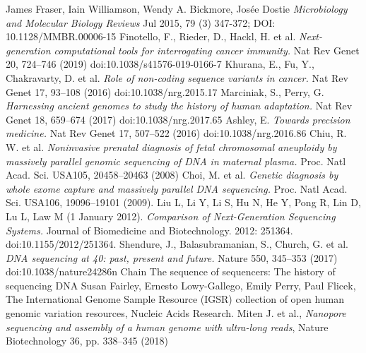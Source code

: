 \documentclass[a4paper,11pt,twoside]{report}
\theoremstyle{definition}
\begin{document}

\begin{thebibliography}{49}%
James Fraser, Iain Williamson, Wendy A. Bickmore, Josée Dostie
\emph{Microbiology and Molecular Biology Reviews} Jul 2015, 79 (3) 347-372; DOI: 10.1128/MMBR.00006-15 
Finotello, F., Rieder, D., Hackl, H. et al. \emph{Next-generation computational tools for interrogating cancer immunity.} Nat Rev Genet 20, 724–746 (2019) doi:10.1038/s41576-019-0166-7
Khurana, E., Fu, Y., Chakravarty, D. et al. \emph{Role of non-coding sequence variants in cancer.} Nat Rev Genet 17, 93–108 (2016) doi:10.1038/nrg.2015.17
 Marciniak, S., Perry, G. \emph{Harnessing ancient genomes to study the history of human adaptation.} Nat Rev Genet 18, 659–674 (2017) doi:10.1038/nrg.2017.65
 Ashley, E. \emph{Towards precision medicine.} Nat Rev Genet 17, 507–522 (2016) doi:10.1038/nrg.2016.86
 Chiu, R. W. et al. \emph{Noninvasive prenatal diagnosis of fetal chromosomal aneuploidy by massively parallel genomic sequencing of DNA in maternal plasma.} Proc. Natl Acad. Sci. USA105, 20458–20463 (2008)
 Choi, M. et al. \emph{Genetic diagnosis by whole exome capture and massively parallel DNA sequencing.} Proc. Natl Acad. Sci. USA106, 19096–19101 (2009).
 Liu L, Li Y, Li S, Hu N, He Y, Pong R, Lin D, Lu L, Law M (1 January 2012). \emph{Comparison of Next-Generation Sequencing Systems.} Journal of Biomedicine and Biotechnology. 2012: 251364. doi:10.1155/2012/251364.
 Shendure, J., Balasubramanian, S., Church, G. et al. \emph{DNA sequencing at 40: past, present and future.} Nature 550, 345–353 (2017) doi:10.1038/nature24286n Chain The sequence of sequencers: The history of sequencing DNA
 Susan Fairley, Ernesto Lowy-Gallego, Emily Perry, Paul Flicek, The International Genome Sample Resource (IGSR) collection of open human genomic variation resources, Nucleic Acids Research.
 Miten J. et al., \emph{Nanopore sequencing and assembly of a human genome with ultra-long reads}, Nature Biotechnology 36, pp. 338–345 (2018) 

\end{thebibliography}
\end{document}
